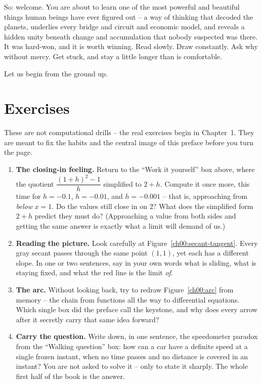So: welcome. You are about to learn one of the most powerful and beautiful things human beings have
ever figured out -- a way of thinking that decoded the planets, underlies every bridge and circuit
and economic model, and reveals a hidden unity beneath change and accumulation that nobody suspected
was there. It was hard-won, and it is worth winning. Read slowly. Draw constantly. Ask why without
mercy. Get stuck, and stay a little longer than is comfortable.

Let us begin from the ground up.

\section*{Exercises}

These are not computational drills -- the real exercises begin in Chapter~1. They are meant to fix
the habits and the central image of this preface before you turn the page.

\begin{enumerate}
  \item \textbf{The closing-in feeling.} Return to the ``Work it yourself'' box above, where the
  quotient $\dfrac{(1+h)^2-1}{h}$ simplified to $2+h$. Compute it once more, this time for
  $h=-0.1$, $h=-0.01$, and $h=-0.001$ -- that is, approaching from \emph{below} $x=1$. Do the values
  still close in on $2$? What does the simplified form $2+h$ predict they must do? (Approaching a
  value from both sides and getting the same answer is exactly what a limit will demand of us.)

  \item \textbf{Reading the picture.} Look carefully at Figure~\ref{ch00:secant-tangent}. Every gray
  secant passes through the same point $(1,1)$, yet each has a different slope. In one or two
  sentences, say in your own words what is sliding, what is staying fixed, and what the red line is
  the limit \emph{of}.

  \item \textbf{The arc.} Without looking back, try to redraw Figure~\ref{ch00:arc} from memory --
  the chain from functions all the way to differential equations. Which single box did the preface
  call the keystone, and why does every arrow after it secretly carry that same idea forward?

  \item \textbf{Carry the question.} Write down, in one sentence, the speedometer paradox from the
  ``Walking question'' box: how can a car have a definite speed at a single frozen instant, when no
  time passes and no distance is covered in an instant? You are not asked to solve it -- only to state
  it sharply. The whole first half of the book is the answer.
\end{enumerate}
